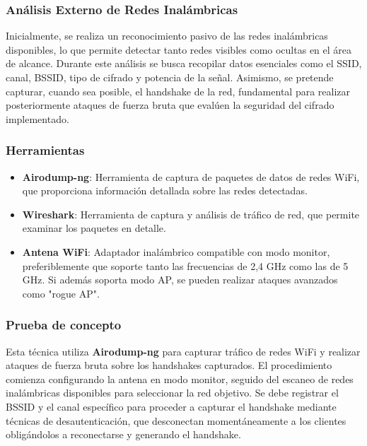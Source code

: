 \documentclass[a4paper, 11pt]{article}
\begin{document}
\subsubsection{Análisis Externo de Redes Inalámbricas}
\label{sec:analisis_redes_inalambricas}

Inicialmente, se realiza un reconocimiento pasivo de las redes inalámbricas disponibles, lo que permite detectar tanto redes visibles como ocultas en el área de alcance. Durante este análisis se busca recopilar datos esenciales como el SSID, canal, BSSID, tipo de cifrado y potencia de la señal. Asimismo, se pretende capturar, cuando sea posible, el handshake de la red, fundamental para realizar posteriormente ataques de fuerza bruta que evalúen la seguridad del cifrado implementado.

\subsubsection*{Herramientas}
\begin{itemize}
    \item \textbf{Airodump-ng}: Herramienta de captura de paquetes de datos de redes WiFi, que proporciona información detallada sobre las redes detectadas.
    \item  \textbf{Wireshark}: Herramienta de captura y análisis de tráfico de red, que permite examinar los paquetes en detalle.
    \item \textbf{Antena WiFi}: Adaptador inalámbrico compatible con modo monitor, preferiblemente que soporte tanto las frecuencias de 2,4 GHz como las de 5 GHz. Si además soporta modo AP, se pueden realizar ataques avanzados como "rogue AP".
\end{itemize}


\subsubsection*{Prueba de concepto}

Esta técnica utiliza \textbf{Airodump-ng} para capturar tráfico de redes WiFi y realizar ataques de fuerza bruta sobre los handshakes capturados. El procedimiento comienza configurando la antena en modo monitor, seguido del escaneo de redes inalámbricas disponibles para seleccionar la red objetivo. Se debe registrar el BSSID y el canal específico para proceder a capturar el handshake mediante técnicas de desautenticación, que desconectan momentáneamente a los clientes obligándolos a reconectarse y generando el handshake.
\end{document}
